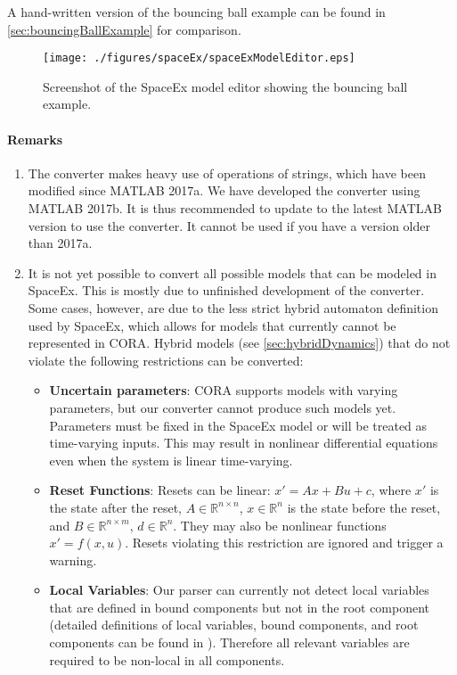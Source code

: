 A hand-written version of the bouncing ball example can be found in \cref{sec:bouncingBallExample} for comparison.

\begin{figure}[htb]
  \centering									 
    \texttt{[image: ./figures/spaceEx/spaceExModelEditor.eps]}
    \caption{Screenshot of the SpaceEx model editor showing the bouncing ball example.}
    \label{fig:spaceExModelEditor}		
\end{figure}

\paragraph{Remarks}

\begin{enumerate}
 \item The converter makes heavy use of operations of strings, which have been modified since MATLAB 2017a. We have developed the converter using MATLAB 2017b. It is thus recommended to update to the latest MATLAB version to use the converter. It cannot be used if you have a version older than 2017a.
 \item It is not yet possible to convert all possible models that can be modeled in SpaceEx. This is mostly due to unfinished development of the converter. Some cases, however, are due to the less strict hybrid automaton definition used by SpaceEx, which allows for models that currently cannot be represented in CORA. Hybrid models (see \cref{sec:hybridDynamics}) that do not violate the following restrictions can be converted:
\begin{itemize}
  \item \textbf{Uncertain parameters}: CORA supports models with varying parameters, but our converter cannot produce such models yet. Parameters must be fixed in the SpaceEx model or will be treated as time-varying inputs. This may result in nonlinear differential equations even when the system is linear time-varying. %
  \item \textbf{Reset Functions}: Resets can be linear: $x' = Ax + Bu + c$, where $x'$ is the state after the reset, $A\in \mathbb{R}^{n \times n}$, $x\in\mathbb{R}^n$ is the state before the reset, and $B\in \mathbb{R}^{n \times m}$, $d\in\mathbb{R}^n$. They may also be nonlinear functions $x' = f(x,u)$. Resets violating this restriction are ignored and trigger a warning.
  \item \textbf{Local Variables}: Our parser can currently not detect local variables that are defined in bound components but not in the root component (detailed definitions of local variables, bound components, and root components can be found in \cite{Cotton2010}). Therefore all relevant variables are required to be non-local in all components.

\end{itemize}
\end{enumerate}
